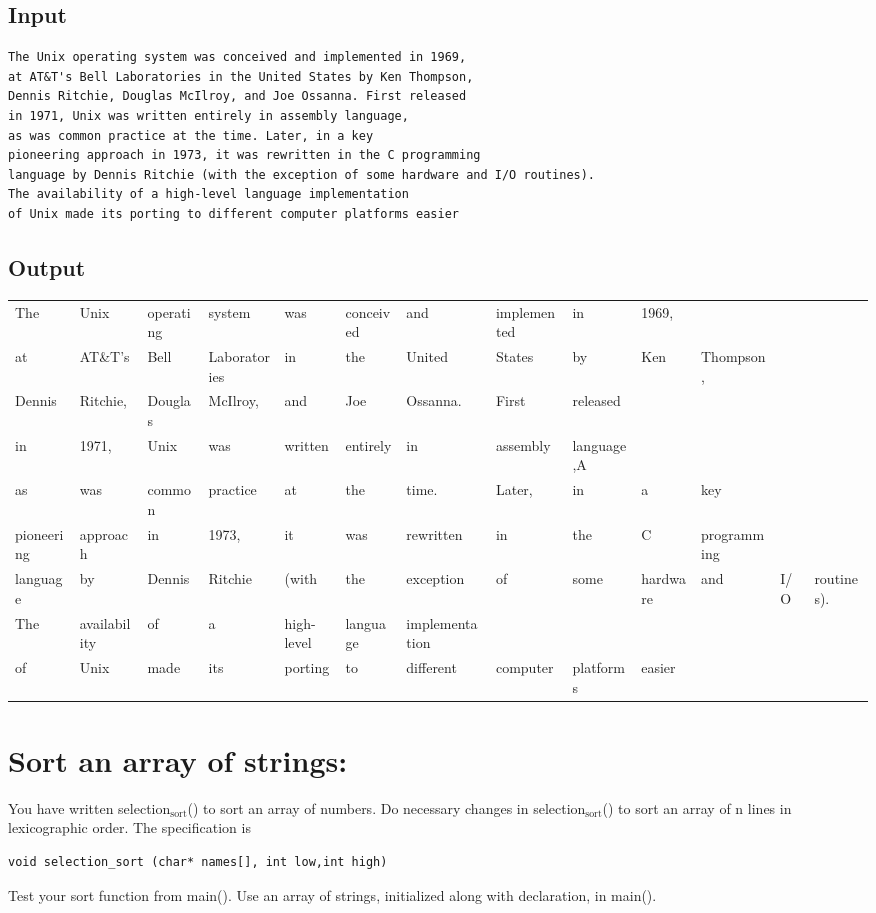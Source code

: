\documentclass[11pt]{article}
\begin{document}
\subsection*{Input}
\label{sec-3-3}
\begin{verbatim}
The Unix operating system was conceived and implemented in 1969,
at AT&T's Bell Laboratories in the United States by Ken Thompson, 
Dennis Ritchie, Douglas McIlroy, and Joe Ossanna. First released 
in 1971, Unix was written entirely in assembly language,
as was common practice at the time. Later, in a key 
pioneering approach in 1973, it was rewritten in the C programming 
language by Dennis Ritchie (with the exception of some hardware and I/O routines).
The availability of a high-level language implementation 
of Unix made its porting to different computer platforms easier
\end{verbatim}
\subsection*{Output}
\label{sec-3-4}
\begin{center}
\begin{tabular}{lllllllllllll}
The & Unix & operating & system & was & conceived & and & implemented & in & 1969, &  &  & \\
at & AT\&T's & Bell & Laboratories & in & the & United & States & by & Ken & Thompson, &  & \\
Dennis & Ritchie, & Douglas & McIlroy, & and & Joe & Ossanna. & First & released &  &  &  & \\
in & 1971, & Unix & was & written & entirely & in & assembly & language,A &  &  &  & \\
as & was & common & practice & at & the & time. & Later, & in & a & key &  & \\
pioneering & approach & in & 1973, & it & was & rewritten & in & the & C & programming &  & \\
language & by & Dennis & Ritchie & (with & the & exception & of & some & hardware & and & I/O & routines).\\
The & availability & of & a & high-level & language & implementation &  &  &  &  &  & \\
of & Unix & made & its & porting & to & different & computer & platforms & easier &  &  & \\
\end{tabular}
\end{center}
\section{Sort an array of strings:}
\label{sec-4}
You have written selection$_{\text{sort}}$() to sort an array of numbers. Do necessary changes in selection$_{\text{sort}}$() to sort an array of n lines in lexicographic order. The specification is
\begin{verbatim}
void selection_sort (char* names[], int low,int high)
\end{verbatim}
Test your sort function from main(). Use an array of strings, initialized along with declaration, in main().
\end{document}
